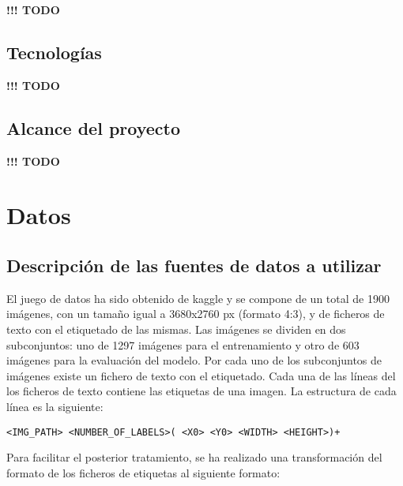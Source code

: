 \documentclass[]{article}
\begin{document}

\textbf{!!! TODO}

\subsection{Tecnologías}


\textbf{!!! TODO}

\subsection{Alcance del proyecto}


\textbf{!!! TODO}


\newpage
\section{Datos}


\subsection{Descripción de las fuentes de datos a utilizar}

El juego de datos ha sido obtenido de kaggle \cite{potholedataset} y se compone de un total de 1900 imágenes, con un tamaño igual a 3680x2760 px (formato 4:3), y de ficheros de texto con el etiquetado de las mismas. Las imágenes se dividen en dos subconjuntos: uno de 1297 imágenes para el entrenamiento y otro de 603 imágenes para la evaluación del modelo. Por cada uno de los subconjuntos de imágenes existe un fichero de texto con el etiquetado. Cada una de las líneas del los ficheros de texto contiene las etiquetas de una imagen. La estructura de cada línea es la siguiente:

\begin{lstlisting}[frame=single,basicstyle=\ttfamily\footnotesize]
<IMG_PATH> <NUMBER_OF_LABELS>( <X0> <Y0> <WIDTH> <HEIGHT>)+
\end{lstlisting}

Para facilitar el posterior tratamiento, se ha realizado una transformación del formato de los ficheros de etiquetas al siguiente formato:
\end{document}
